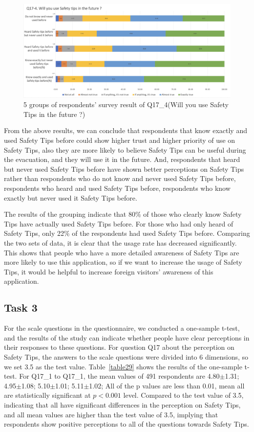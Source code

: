 \begin{figure}[h]
  \includegraphics[width=0.8\linewidth]{Figure/Figure22.jpg}
  \centering
  \caption[5 groups of respondents' survey result of Q17\_4]{5 groups of respondents' survey result of Q17\_4(Will you use Safety Tips in the future ?)}
  \label{fig22}
\end{figure}

From the above results, we can conclude that respondents that know exactly and used Safety Tips before could show higher trust and higher priority of use on Safety Tips, also they are more likely to believe Safety Tips can be useful during the evacuation, and they will use it in the future. And, respondents that heard but never used  Safety Tips before have shown better perceptions on Safety Tips rather than respondents who do not know and never used  Safety Tips before, respondents who heard and used Safety Tips before, respondents who know exactly but never used it Safety Tips before.

The results of the grouping indicate that 80\% of those who clearly know Safety Tips have actually used Safety Tips before. For those who had only heard of Safety Tips, only 22\% of the respondents had used Safety Tips before. Comparing the two sets of data, it is clear that the usage rate has decreased significantly. This shows that people who have a more detailed awareness of Safety Tips are more likely to use this application, so if we want to increase the usage of Safety Tips, it would be helpful to increase foreign visitors' awareness of this application.

\subsection{Task 3}
\label{task3}
For the scale questions in the questionnaire, we conducted a one-sample t-test, and the results of the study can indicate whether people have clear perceptions in their responses to these questions. For question Q17 about the perception on Safety Tips, the answers to the scale questions were divided into 6 dimensions, so we set 3.5 as the test value. Table~\ref{table29} shows the results of the one-sample t-test. For Q17\_1 to Q17\_1, the mean values of 491 respondents are 4.80$\pm$1.31; 4.95$\pm$1.08; 5.10$\pm$1.01; 5.11$\pm$1.02; All of the p values are less than 0.01, mean all are statistically significant at $p<0.001$ level. Compared to the test value of 3.5, indicating that all have significant differences in the perception on Safety Tips, and all mean values are higher than the test value of 3.5, implying that respondents show positive perceptions to all of the questions towards Safety Tips. 

